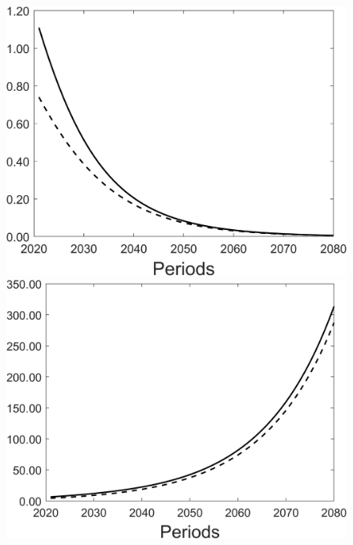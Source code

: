 \begin{figure}[h!!]
	\begin{minipage}[]{0.32\textwidth}
		\includegraphics[width=1\textwidth]{../../codding_model/Own/figures/Rep_agent/staticBAU_LF_separate_yc_periods59_eppsilon4.00_zeta1.40_Ad08_Ac04_thetac0.70_thetad0.56_HetGrowth1_tauul0.181_util0_withtarget0_lgd0.png}
	\end{minipage}
	\begin{minipage}[]{0.32\textwidth}
		\includegraphics[width=1\textwidth]{../../codding_model/Own/figures/Rep_agent/staticBAU_LF_separate_yd_periods59_eppsilon4.00_zeta1.40_Ad08_Ac04_thetac0.70_thetad0.56_HetGrowth1_tauul0.181_util0_withtarget0_lgd0.png}

\end{minipage}
\end{figure}
